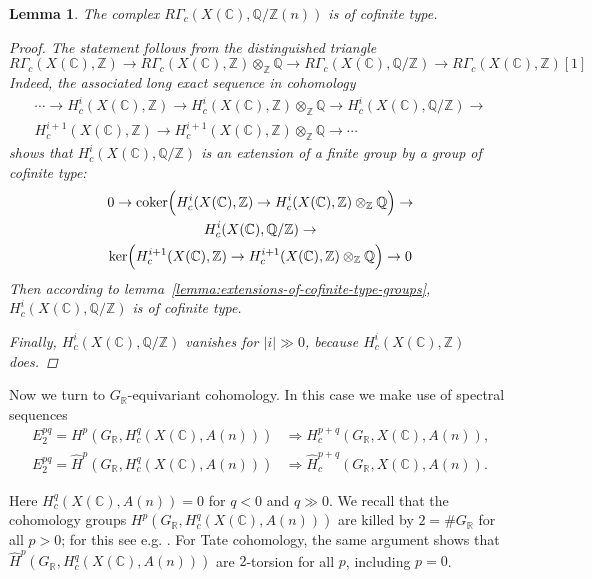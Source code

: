 \documentclass[leqno,12pt]{article}
\theoremstyle{plain}
\newtheorem{lemma}[theorem]{\indent\sc Lemma}
\theoremstyle{definition}
\DeclareMathOperator{\coker}{coker}
\newcommand{\CC}{\mathbb{C}}
\newcommand{\QQ}{\mathbb{Q}}
\newcommand{\RR}{\mathbb{R}}
\newcommand{\ZZ}{\mathbb{Z}}
\begin{document}
\begin{lemma}
  The complex $R\Gamma_c (X (\CC), \QQ/\ZZ (n))$ is of cofinite type.

  \begin{proof}
    The statement follows from the distinguished triangle
    \[ R\Gamma_c (X (\CC), \ZZ) \to
    R\Gamma_c (X (\CC), \ZZ)\otimes_\ZZ \QQ \to
    R\Gamma_c (X (\CC), \QQ/\ZZ) \to
    R\Gamma_c (X (\CC), \ZZ) [1] \]
    Indeed, the associated long exact sequence in cohomology
    \begin{multline*}
      \cdots \to H^i_c (X (\CC), \ZZ) \to
      H^i_c (X (\CC), \ZZ)\otimes_\ZZ \QQ \to
      H^i_c (X (\CC), \QQ/\ZZ) \to\\
      H^{i+1}_c (X (\CC), \ZZ) \to
      H^{i+1}_c (X (\CC), \ZZ)\otimes_\ZZ \QQ \to \cdots
    \end{multline*}
    shows that $H^i_c (X (\CC), \QQ/\ZZ)$ is an extension of a finite group by a
    group of cofinite type:
    \begin{multline*}
      0 \to \coker \Bigl(H^i_c (X (\CC), \ZZ) \to
      H^i_c (X (\CC), \ZZ)\otimes_\ZZ \QQ\Bigr) \to\\
      H^i_c (X (\CC), \QQ/\ZZ) \to\\
      \ker \Bigl(H^{i+1}_c (X (\CC), \ZZ) \to
      H^{i+1}_c (X (\CC), \ZZ)\otimes_\ZZ \QQ\Bigr) \to 0
    \end{multline*}
    Then according to lemma~\ref{lemma:extensions-of-cofinite-type-groups},
    $H^i_c (X (\CC), \QQ/\ZZ)$ is of cofinite type.

    Finally, $H^i_c (X (\CC), \QQ/\ZZ)$ vanishes for $|i| \gg 0$, because
    $H^i_c (X (\CC), \ZZ)$ does.
  \end{proof}
\end{lemma}

Now we turn to $G_\RR$-equivariant cohomology. In this case we make use of
spectral sequences
\begin{align*}
  E_2^{pq} = H^p (G_\RR, H_c^q (X (\CC), A (n))) & \Longrightarrow H_c^{p+q} (G_\RR, X (\CC), A (n)), \\
  E_2^{pq} = \widehat{H}^p (G_\RR, H_c^q (X (\CC), A (n))) & \Longrightarrow \widehat{H}_c^{p+q} (G_\RR, X (\CC), A (n)).
\end{align*}

Here $H_c^q (X (\CC), A (n)) = 0$ for $q < 0$ and $q \gg 0$. We recall that the
cohomology groups $H^p (G_\RR, H_c^q (X (\CC), A (n)))$ are killed by
$2 = \# G_\RR$ for all $p > 0$; for this see e.g.
\cite[Theorem~6.5.8]{Weibel-1994}. For Tate cohomology, the same argument shows
that $\widehat{H}^p (G_\RR, H_c^q (X (\CC), A (n)))$ are $2$-torsion for all
$p$, including $p = 0$.
\end{document}
